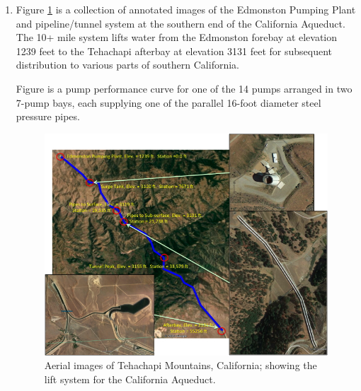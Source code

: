 \documentclass[12pt]{article}
\begin{document}
\begin{enumerate}
\item Figure \ref{fig:PumpPlantPicture} is a collection of annotated images of the Edmonston Pumping Plant and pipeline/tunnel system at the southern end of the California Aqueduct.  The 10+ mile system lifts water from the Edmonston forebay at elevation 1239 feet to the Tehachapi afterbay at elevation 3131 feet for subsequent distribution to various parts of southern California.

Figure %
is a pump performance curve for one of the 14 pumps arranged in two 7-pump bays, each supplying one of the parallel 16-foot diameter steel pressure pipes. 
\begin{figure}[ht!] %
   \centering
   \includegraphics[width=6.5in]{PumpPlantPicture.jpg} 
   \caption{Aerial images of Tehachapi Mountains, California;  showing the lift system for the California Aqueduct.}
   \label{fig:PumpPlantPicture}
\end{figure}


\end{enumerate}
\end{document}
